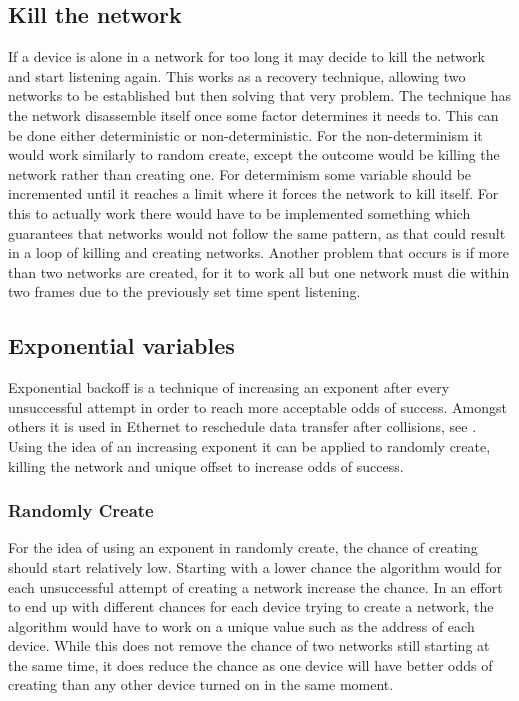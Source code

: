\subsection{Kill the network}\label{KtN}
If a device is alone in a network for too long it may decide to kill the network and start listening again.
This works as a recovery technique, allowing two networks to be established but then solving that very problem.
The technique has the network disassemble itself once some factor determines it needs to.
This can be done either deterministic or non-deterministic.
For the non-determinism it would work similarly to random create, except the outcome would be killing the network rather than creating one.
For determinism some variable should be incremented until it reaches a limit where it forces the network to kill itself.
For this to actually work there would have to be implemented something which guarantees that networks would not follow the same pattern, as that could result in a loop of killing and creating networks.
Another problem that occurs is if more than two networks are created, for it to work all but one network must die within two frames due to the previously set time spent listening.

\subsection{Exponential variables}
Exponential backoff is a technique of increasing an exponent after every unsuccessful attempt in order to reach more acceptable odds of success.
Amongst others it is used in Ethernet to reschedule data transfer after collisions, see \citep{Ebackoff}.
Using the idea of an increasing exponent it can be applied to randomly create, killing the network and unique offset to increase odds of success.
\subsubsection*{Randomly Create}
For the idea of using an exponent in randomly create, the chance of creating should start relatively low.
Starting with a lower chance the algorithm would for each unsuccessful attempt of creating a network increase the chance.
In an effort to end up with different chances for each device trying to create a network, the algorithm would have to work on a unique value such as the address of each device.
While this does not remove the chance of two networks still starting at the same time, it does reduce the chance as one device will have better odds of creating than any other device turned on in the same moment.
